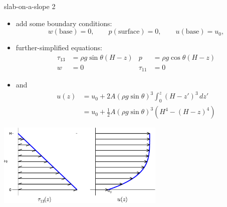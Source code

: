 \begin{frame}{slab-on-a-slope 2}

\small
\begin{itemize}
\item add some boundary conditions:
	$$w(\text{base})=0, \qquad p(\text{surface})=0, \qquad u(\text{base})=u_0,$$
\item further-simplified equations:
\begin{align*}
\tau_{13} &= \rho g \sin\theta (H-z) &  p &= \rho g \cos\theta (H-z) \\
w &= 0  & \tau_{11} &= 0
\end{align*}
\item and 
\vspace{-0.2in}
\begin{align*}
u(z) &= u_0 + 2 A (\rho g \sin\theta)^3 \int_0^z (H-z')^3\,dz' \\
     &= u_0 + \frac{1}{2} A (\rho g \sin\theta)^3  \left(H^4 - (H-z)^4\right)
\end{align*}

\vspace{-0.1in}
\end{itemize}
\begin{center}
\includegraphics[width=0.6\textwidth]{photos/slabfigs}
\end{center}
\end{frame}


